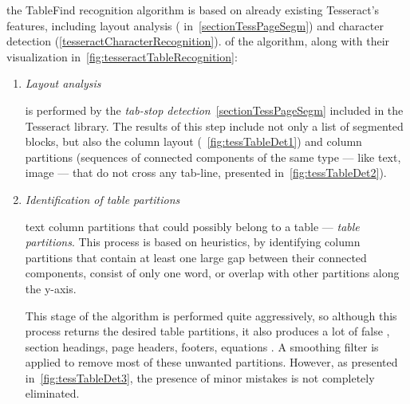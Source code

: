 the TableFind recognition algorithm is based on already existing Tesseract's features, including layout analysis ( in~\cref{sectionTessPageSegm}) and character detection (\cref{tesseractCharacterRecognition}).  of the algorithm, along with their visualization in~\cref{fig:tesseractTableRecognition}: 

\begin{enumerate}
\item \emph{Layout analysis}

 is performed by the  \emph{tab-stop detection}~\cref{sectionTessPageSegm} included in the Tesseract library. The results of this step include not only a list of segmented blocks, but also the column layout (~\cref{fig:tessTableDet1}) and column partitions (sequences of connected components of the same type --- like text, image --- that do not cross any tab-line, presented in~\cref{fig:tessTableDet2}).

\item \emph{Identification of table partitions}

 text column partitions that could possibly belong to a table --- \emph{table partitions}. This process is based on heuristics, by identifying column partitions that contain at least one large gap between their connected components, consist of only one word, or overlap with other partitions along the y-axis.

This stage of the algorithm is performed quite aggressively, so although this process returns the desired table partitions, it also produces a lot of false ,  section headings, page headers, footers, equations . A smoothing filter is applied to remove most of these unwanted partitions. However, as presented in~\cref{fig:tessTableDet3}, the presence of minor mistakes is not completely eliminated.


\end{enumerate}
